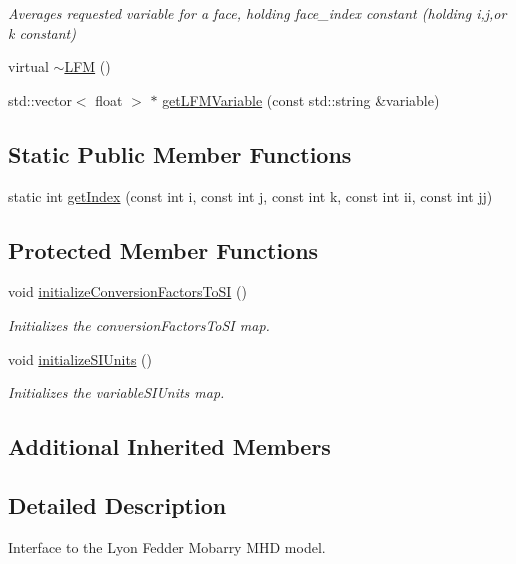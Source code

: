 \begin{DoxyCompactItemize}
\begin{DoxyCompactList}\small\item\em Averages requested variable for a face, holding face\-\_\-index constant (holding i,j,or k constant) \end{DoxyCompactList}\item 
virtual \hyperlink{classccmc_1_1_l_f_m_ab7867c983e99e38e19e120dcbf38420c}{$\sim$\-L\-F\-M} ()
\item 
std\-::vector$<$ float $>$ $\ast$ \hyperlink{classccmc_1_1_l_f_m_a72536081ec39b9f9620b49e4a4ac58d5}{get\-L\-F\-M\-Variable} (const std\-::string \&variable)
\end{DoxyCompactItemize}
\subsection*{Static Public Member Functions}
\begin{DoxyCompactItemize}
\item 
static int \hyperlink{classccmc_1_1_l_f_m_ace1eb0153ce938756984444bba34a7cb}{get\-Index} (const int i, const int j, const int k, const int ii, const int jj)
\end{DoxyCompactItemize}
\subsection*{Protected Member Functions}
\begin{DoxyCompactItemize}
\item 
void \hyperlink{classccmc_1_1_l_f_m_a575ca8f71a149babc45fe840fbf66daf}{initialize\-Conversion\-Factors\-To\-S\-I} ()
\begin{DoxyCompactList}\small\item\em Initializes the conversion\-Factors\-To\-S\-I map.  \end{DoxyCompactList}\item 
void \hyperlink{classccmc_1_1_l_f_m_ab82dc1add65cfa4c40bff916129c4a41}{initialize\-S\-I\-Units} ()
\begin{DoxyCompactList}\small\item\em Initializes the variable\-S\-I\-Units map.  \end{DoxyCompactList}\end{DoxyCompactItemize}
\subsection*{Additional Inherited Members}


\subsection{Detailed Description}
Interface to the Lyon Fedder Mobarry M\-H\-D model. 

